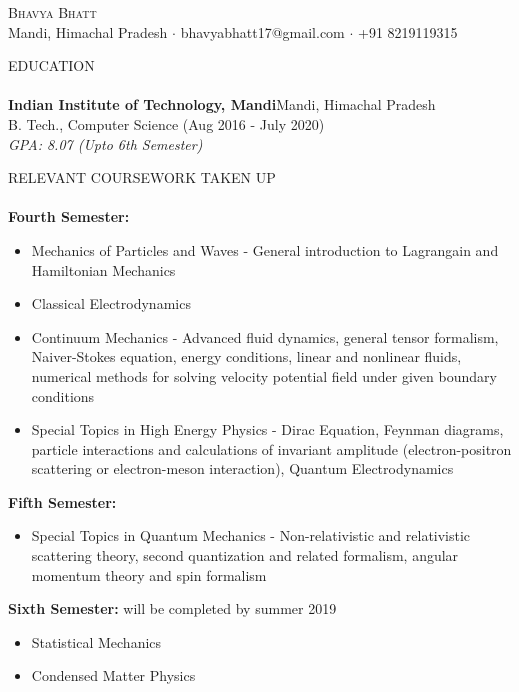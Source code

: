 \documentclass[a4paper]{article}
\newcommand{\lineunder} {
    \vspace*{-8pt} \\
    \hspace*{-18pt} \hrulefill \\
}
\newcommand{\header} [1] {
    {\hspace*{-18pt}\vspace*{6pt} \textsc{#1}}
    \vspace*{-6pt} \lineunder
}
\begin{document}
\vspace*{-40pt}

    

\vspace*{-10pt}
\begin{center}
    {\Huge \scshape {Bhavya Bhatt}}\\
    Mandi, Himachal Pradesh $\cdot$ bhavyabhatt17@gmail.com $\cdot$ +91 8219119315\\
\end{center}

\header{EDUCATION}
\textbf{Indian Institute of Technology, Mandi}\hfill Mandi, Himachal Pradesh\\
B. Tech., Computer Science (Aug 2016 - July 2020)\\
 \textit{GPA: 8.07 (Upto 6th Semester)}
\vspace{2mm}

\header{RELEVANT COURSEWORK TAKEN UP}
\textbf{Fourth Semester: }
\begin{itemize} \itemsep 1pt
    \item Mechanics of Particles and Waves - General introduction to Lagrangain and Hamiltonian Mechanics\\
    \item Classical Electrodynamics\\
    \item Continuum Mechanics - Advanced fluid dynamics, general tensor formalism, Naiver-Stokes equation, energy conditions, linear and nonlinear fluids, numerical methods for solving velocity potential field under given boundary conditions\\
    \item Special Topics in High Energy Physics - Dirac Equation, Feynman diagrams, particle interactions and calculations of invariant amplitude (electron-positron scattering or electron-meson interaction), Quantum Electrodynamics \\
\end{itemize}
\textbf{Fifth Semester: }
\begin{itemize} \itemsep 1pt
    \item Special Topics in Quantum Mechanics - Non-relativistic and relativistic scattering theory, second quantization and related formalism, angular momentum theory and spin formalism\\
\end{itemize}
\textbf{Sixth Semester: }\hfill *will be completed by summer 2019
\begin{itemize} \itemsep 1pt
    \item Statistical Mechanics\\
    \item Condensed Matter Physics\\
\end{itemize}
\vspace{2mm}
\end{document}
